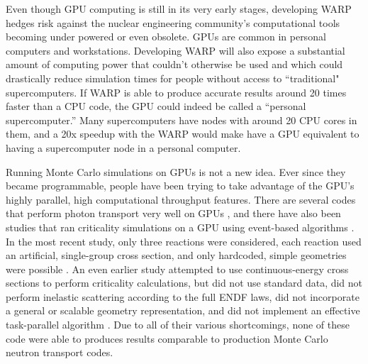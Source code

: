 Even though GPU computing is still in its very early stages, developing WARP hedges risk against the nuclear engineering community's computational tools becoming under powered or even obsolete.  GPUs are common in personal computers and workstations.  Developing WARP will also expose a substantial amount of  computing power that couldn't otherwise be used and which could drastically reduce simulation times for people without access to ``traditional" supercomputers.  If WARP is able to produce accurate results around 20 times faster than a CPU code, the GPU could indeed be called a ``personal supercomputer.''   Many supercomputers have nodes with around 20 CPU cores in them, and a 20x speedup with the WARP would make have a GPU equivalent to having a supercomputer node in a personal computer.

Running Monte Carlo simulations on GPUs is not a new idea.  Ever since they became programmable, people have been trying to take advantage of the GPU's highly parallel, high computational throughput features.  There are several codes that perform photon transport very well on GPUs \cite{henderson,archer}, and there have also been studies that ran criticality simulations on a GPU using event-based algorithms \cite{tianyu,tianyu_snamc,nelson}.  In the most recent study, only three reactions were considered, each reaction used an artificial, single-group cross section, and only hardcoded, simple geometries were possible \cite{tianyu,tianyu_snamc}.  An even earlier study attempted to use continuous-energy cross sections to perform criticality calculations, but did not use standard data, did not perform inelastic scattering according to the full ENDF laws, did not incorporate a general or scalable geometry representation, and did not implement an effective task-parallel algorithm \cite{nelson}.  Due to all of their various shortcomings, none of these code were able to produces results comparable to production Monte Carlo neutron transport codes.

